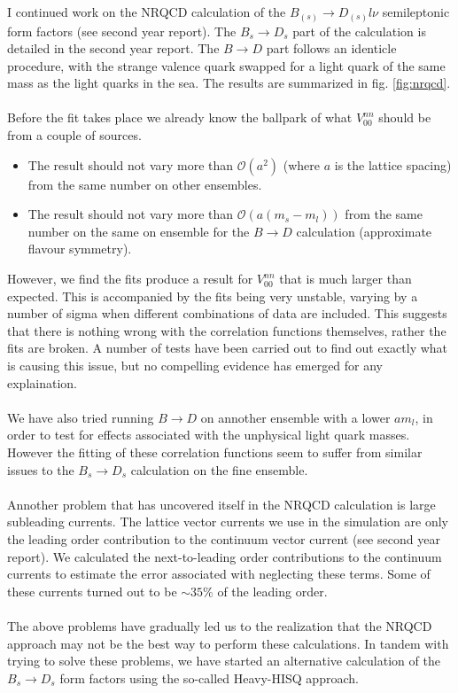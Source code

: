 I continued work on the NRQCD calculation of the $B_{(s)}\to D_{(s)} l\nu$ semileptonic form factors (see second 
year report). The $B_s\to D_s$ part of the calculation is detailed in the second year report. The $B\to D$ part follows an identicle procedure, with the strange valence quark swapped for a light quark of the same mass as the light quarks in the sea. The results are summarized in fig. \ref{fig:nrqcd}.
\\ \\
Before the fit takes place we already know the ballpark of what $V^{nn}_{00}$ should be from a couple of sources.
\begin{itemize}
\item
The result should not vary more than $\mathcal{O}(a^2)$ (where $a$ is the lattice spacing) from the same number on other ensembles.
\item
The result should not vary more than $\mathcal{O}(a(m_s - m_l))$ from the same number on the same on ensemble for the $B\to D$ calculation (approximate flavour symmetry).
\end{itemize}
However, we find the fits produce a result for $V^{nn}_{00}$ that is much larger than expected. This is accompanied by the fits being very unstable, varying by a number of sigma when different combinations of data are included. This suggests that there is nothing wrong with the correlation functions themselves, rather the fits are broken. A number of tests have been carried out to find out exactly what is causing this issue, but no compelling evidence has emerged for any explaination.
\\ \\
We have also tried running $B \to D$ on annother ensemble with a lower $am_l$, in order to test for effects associated with the unphysical light quark masses. However the fitting of these correlation functions seem to suffer from similar issues to the $B_s\to D_s$ calculation on the fine ensemble.
\\ \\
Annother problem that has uncovered itself in the NRQCD calculation is large subleading currents. The lattice vector currents we use in the simulation are only the leading order contribution to the continuum vector current (see second year report). We calculated the next-to-leading order contributions to the continuum currents to estimate the error associated with neglecting these terms. Some of these currents turned out to be $\sim 35\%$ of the leading order.
\\ \\
The above problems have gradually led us to the realization that the NRQCD approach may not be the best way to perform these calculations. In tandem with trying to solve these problems, we have started an alternative calculation of the $B_s \to D_s$ form factors using the so-called Heavy-HISQ approach.

